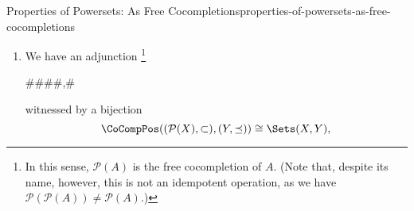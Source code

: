 \begin{proposition}{Properties of Powersets: As Free Cocompletions}{properties-of-powersets-as-free-cocompletions}
\begin{enumerate}
            \begin{itemize}
                \item[$(\star)$]Given another pair $(Y,f)$ consisting of
                    \begin{itemize}
                        \item A cocomplete poset $(Y,\preceq)$;
                        \item A function $f\colon X\to Y$;
                    \end{itemize}
                    there exists a unique cocontinuous morphism of posets
                    \[
                        (\mathcal{P}(X),\subset)\uearrow(Y,\preceq)%
                    \]%
                    making the diagram
                    \[
                        \begin{tikzcd}[row sep={5.0*\the\DL,between origins}, column sep={5.0*\the\DL,between origins}, background color=backgroundColor, ampersand replacement=\&]
                            \&
                            \mathcal{P}(X)
                            \arrow[d,"\exists!",dashed]
                            \\
                            X
                            \arrow[r,"f"']
                            \arrow[ru,"{\chi_{X}}"]
                            \&
                            Y
                        \end{tikzcd}
                    \]%
                    commute.
            \end{itemize}
        \item\label{properties-of-powersets-as-free-cocompletions-adjointness}We have an adjunction%
            \footnote{%
                In this sense, $\mathcal{P}(A)$ is the free cocompletion of $A$. (Note that, despite its name, however, this is not an idempotent operation, as we have $\mathcal{P}(\mathcal{P}(A))\neq\mathcal{P}(A)$.)
                \par\vspace*{-1.75\baselineskip}
            }%
            \begin{webcompile}
                \Adjunction##\Wasureru#\Sets#\CoCompPos,#
            \end{webcompile}%
            witnessed by a bijection%
            \[
                \CoCompPos((\mathcal{P}(X),\subset),(Y,\preceq))
                \cong%
                \Sets(X,Y),
            \]%

\end{enumerate}
\end{proposition}
